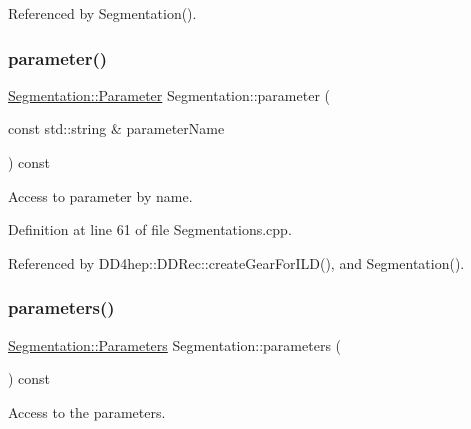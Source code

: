 Referenced by Segmentation().

\hypertarget{class_d_d4hep_1_1_geometry_1_1_segmentation_a6a29d01c01a7f2a1717662800afd1245}{}\label{class_d_d4hep_1_1_geometry_1_1_segmentation_a6a29d01c01a7f2a1717662800afd1245} 
\subsubsection{\texorpdfstring{parameter()}{parameter()}}
{\footnotesize\ttfamily \hyperlink{class_d_d4hep_1_1_geometry_1_1_segmentation_a179c843c1bc64eabb85be55e2538be19}{Segmentation\+::\+Parameter} Segmentation\+::parameter (\begin{DoxyParamCaption}\item[{const std\+::string \&}]{parameter\+Name }\end{DoxyParamCaption}) const}



Access to parameter by name. 



Definition at line 61 of file Segmentations.\+cpp.



Referenced by D\+D4hep\+::\+D\+D\+Rec\+::create\+Gear\+For\+I\+L\+D(), and Segmentation().

\hypertarget{class_d_d4hep_1_1_geometry_1_1_segmentation_a6163224b6fd21e69af1414cdd747d40a}{}\label{class_d_d4hep_1_1_geometry_1_1_segmentation_a6163224b6fd21e69af1414cdd747d40a} 
\subsubsection{\texorpdfstring{parameters()}{parameters()}}
{\footnotesize\ttfamily \hyperlink{class_d_d4hep_1_1_geometry_1_1_segmentation_af7d9af7b574fa9039f44befc61b7e46f}{Segmentation\+::\+Parameters} Segmentation\+::parameters (\begin{DoxyParamCaption}{ }\end{DoxyParamCaption}) const}



Access to the parameters. 



